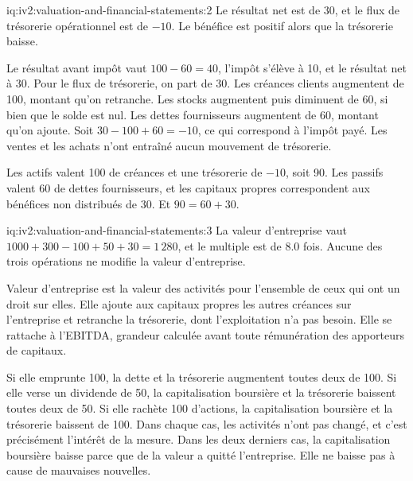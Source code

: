 \begin{solution}{iq:iv2:valuation-and-financial-statements:2}
Le résultat net est de 30, et le flux de trésorerie opérationnel est de $-10$. Le bénéfice est positif alors que la trésorerie baisse.

Le résultat avant impôt vaut $100 - 60 = 40$, l'impôt s'élève à 10, et le résultat net à 30. Pour le flux de trésorerie, on part de 30. Les créances clients augmentent de 100, montant qu'on retranche. Les stocks augmentent puis diminuent de 60, si bien que le solde est nul. Les dettes fournisseurs augmentent de 60, montant qu'on ajoute. Soit $30 - 100 + 60 = -10$, ce qui correspond à l'impôt payé. Les ventes et les achats n'ont entraîné aucun mouvement de trésorerie.

Les actifs valent 100 de créances et une trésorerie de $-10$, soit 90. Les passifs valent 60 de dettes fournisseurs, et les capitaux propres correspondent aux bénéfices non distribués de 30. Et $90 = 60 + 30$.

\end{solution}

\begin{solution}{iq:iv2:valuation-and-financial-statements:3}
La valeur d'entreprise vaut $1000 + 300 - 100 + 50 + 30 = 1\,280$, et le multiple est de 8.0 fois. Aucune des trois opérations ne modifie la valeur d'entreprise.

Valeur d'entreprise est la valeur des activités pour l'ensemble de ceux qui ont un droit sur elles. Elle ajoute aux capitaux propres les autres créances sur l'entreprise et retranche la trésorerie, dont l'exploitation n'a pas besoin. Elle se rattache à l'EBITDA, grandeur calculée avant toute rémunération des apporteurs de capitaux.

Si elle emprunte 100, la dette et la trésorerie augmentent toutes deux de 100. Si elle verse un dividende de 50, la capitalisation boursière et la trésorerie baissent toutes deux de 50. Si elle rachète 100 d'actions, la capitalisation boursière et la trésorerie baissent de 100. Dans chaque cas, les activités n'ont pas changé, et c'est précisément l'intérêt de la mesure. Dans les deux derniers cas, la capitalisation boursière baisse parce que de la valeur a quitté l'entreprise. Elle ne baisse pas à cause de mauvaises nouvelles.

\end{solution}

